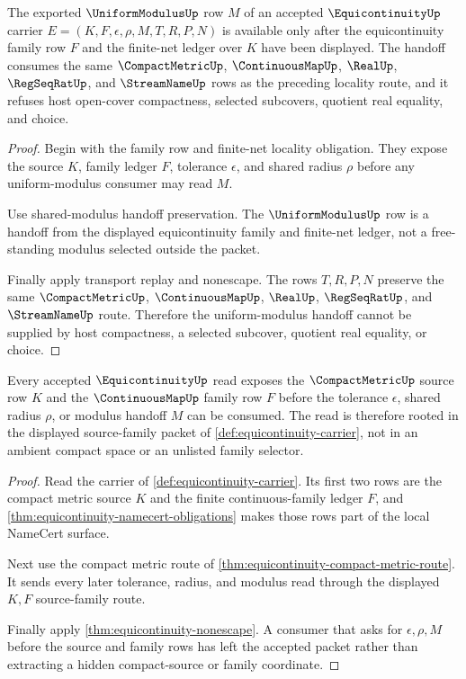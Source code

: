 \begin{theorem}
\label{thm:equicontinuity-root-obligation-uniform-modulus}
The exported $\UniformModulusUp$ row $M$ of an accepted
$\EquicontinuityUp$ carrier $E=(K,F,\epsilon,\rho,M,T,R,P,N)$ is available
only after the equicontinuity family row $F$ and the finite-net ledger over
$K$ have been displayed. The handoff consumes the same $\CompactMetricUp$,
$\ContinuousMapUp$, $\RealUp$, $\RegSeqRatUp$, and $\StreamNameUp$ rows as
the preceding locality route, and it refuses host open-cover compactness,
selected subcovers, quotient real equality, and choice.
\end{theorem}
\begin{proof}
Begin with the family row and finite-net locality obligation. They expose the
source $K$, family ledger $F$, tolerance $\epsilon$, and shared radius $\rho$
before any uniform-modulus consumer may read $M$.

Use shared-modulus handoff preservation. The $\UniformModulusUp$ row is a
handoff from the displayed equicontinuity family and finite-net ledger, not a
free-standing modulus selected outside the packet.

Finally apply transport replay and nonescape. The rows $T,R,P,N$ preserve the
same $\CompactMetricUp$, $\ContinuousMapUp$, $\RealUp$, $\RegSeqRatUp$, and
$\StreamNameUp$ route. Therefore the uniform-modulus handoff cannot be
supplied by host compactness, a selected subcover, quotient real equality, or
choice.
\end{proof}

\begin{theorem}
\label{thm:equicontinuity-root-obligation-source-family}
Every accepted $\EquicontinuityUp$ read exposes the $\CompactMetricUp$ source
row $K$ and the $\ContinuousMapUp$ family row $F$ before the tolerance
$\epsilon$, shared radius $\rho$, or modulus handoff $M$ can be consumed. The
read is therefore rooted in the displayed source-family packet of
\autoref{def:equicontinuity-carrier}, not in an ambient compact space or an
unlisted family selector.
\end{theorem}
\begin{proof}
Read the carrier of \autoref{def:equicontinuity-carrier}. Its first two rows
are the compact metric source $K$ and the finite continuous-family ledger $F$,
and \autoref{thm:equicontinuity-namecert-obligations} makes those rows part of
the local NameCert surface.

Next use the compact metric route of
\autoref{thm:equicontinuity-compact-metric-route}. It sends every later
tolerance, radius, and modulus read through the displayed $K,F$ source-family
route.

Finally apply \autoref{thm:equicontinuity-nonescape}. A consumer that asks for
$\epsilon,\rho,M$ before the source and family rows has left the accepted
packet rather than extracting a hidden compact-source or family coordinate.
\end{proof}


